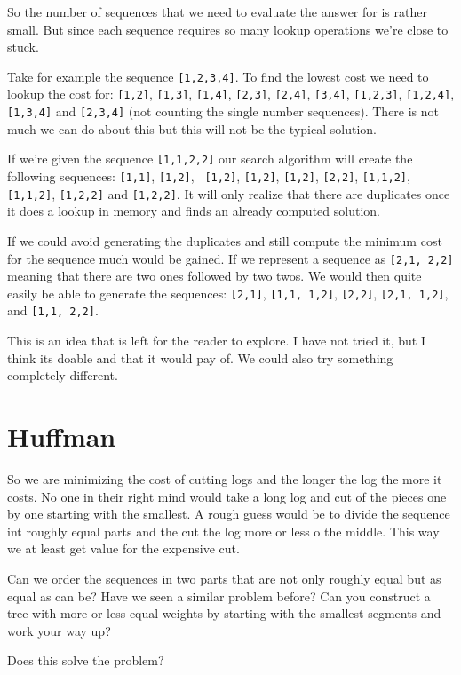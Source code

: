 \documentclass[a4paper,11pt]{article}
\begin{document}
So the number of sequences that we need to evaluate the answer for is
rather small. But since each sequence requires so many lookup
operations we're close to stuck.

Take for example the sequence {\tt [1,2,3,4]}. To find the lowest cost
we need to lookup the cost for: {\tt [1,2]}, {\tt [1,3]}, {\tt [1,4]},
{\tt [2,3]}, {\tt [2,4]}, {\tt [3,4]}, {\tt [1,2,3]}, {\tt [1,2,4]},
{\tt [1,3,4]} and {\tt [2,3,4]} (not counting the single number
sequences). There is not much we can do about this but this will not
be the typical solution.

If we're given the sequence {\tt [1,1,2,2]} our search algorithm will
create the following sequences: {\tt [1,1]}, {\tt [1,2]}, {\tt
  [1,2]}, {\tt [1,2]}, {\tt [1,2]}, {\tt [2,2]}, {\tt [1,1,2]}, {\tt
  [1,1,2]}, {\tt [1,2,2]} and {\tt [1,2,2]}. It will only realize that
there are duplicates once it does a lookup in memory and finds an
already computed solution.

If we could avoid generating the duplicates and still compute the
minimum cost for the sequence much would be gained. If we represent a
sequence as {\tt [{2,1}, {2,2}]} meaning that there are two ones
followed by two twos. We would then quite easily be able to generate
the sequences: {\tt [{2,1}]}, {\tt [{1,1}, {1,2}]}, {\tt [{2,2}]},
{\tt [{2,1}, {1,2}]}, and {\tt [{1,1}, {2,2}]}.

This is an idea that is left for the reader to explore. I have not
tried it, but I think its doable and that it would pay of. We could
also try something completely different.

\section*{Huffman}

So we are minimizing the cost of cutting logs and the longer the log
the more it costs. No one in their right mind would take a long log
and cut of the pieces one by one starting with the smallest. A rough
guess would be to divide the sequence int roughly equal parts and the
cut the log more or less o the middle. This way we at least get value
for the expensive cut.

Can we order the sequences in two parts that are not only roughly equal
but as equal as can be? Have we seen a similar problem before? Can you
construct a tree with more or less equal weights by starting with the
smallest segments and work your way up?

Does this solve the problem?
\end{document}
